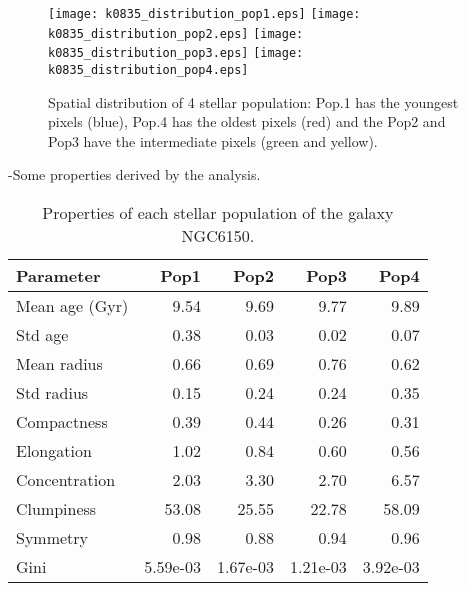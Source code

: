 \begin{figure}[bh]
\begin{center}
\texttt{[image: k0835\_distribution\_pop1.eps]}
\texttt{[image: k0835\_distribution\_pop2.eps]}
\texttt{[image: k0835\_distribution\_pop3.eps]}
\texttt{[image: k0835\_distribution\_pop4.eps]}
 \caption{Spatial distribution of 4 stellar population: Pop.1 has the youngest pixels (blue), Pop.4 has the oldest pixels (red) and the Pop2 and Pop3 have the intermediate pixels (green and yellow).}
   \label{fig1}
\end{center}
\end{figure}

-Some properties derived by the analysis.


\begin{table}[h]
\centering
\begin{tabular}{l|r|r|r|r}
Parameter & Pop1 & Pop2 & Pop3 & Pop4 \\\hline
Mean age (Gyr) & 9.54 & 9.69 & 9.77 & 9.89 \\
Std age & 0.38 & 0.03 & 0.02 & 0.07 \\
Mean radius & 0.66 & 0.69 & 0.76 & 0.62 \\
Std radius & 0.15 & 0.24 & 0.24 & 0.35 \\
Compactness & 0.39 & 0.44 & 0.26 & 0.31 \\
Elongation & 1.02 & 0.84 & 0.60 & 0.56 \\
Concentration & 2.03 & 3.30 & 2.70 & 6.57 \\
Clumpiness & 53.08 & 25.55 & 22.78 & 58.09 \\
Symmetry & 0.98 & 0.88 & 0.94 & 0.96 \\
Gini & 5.59e-03 & 1.67e-03 & 1.21e-03 & 3.92e-03 \\
\end{tabular}
\caption{\label{tab:widgets}Properties of each stellar population of the galaxy NGC6150.}
\end{table}



